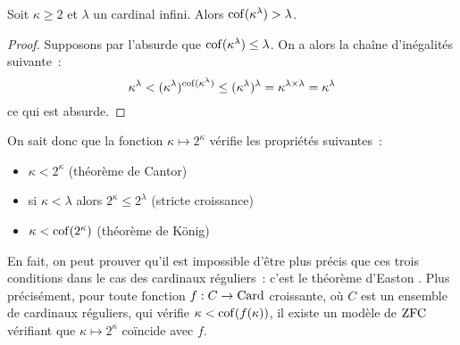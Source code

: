 \begin{theorem}
  Soit $\kappa \geq 2$ et $\lambda$ un cardinal infini. Alors
  $\operatorname{cof}(\kappa^\lambda) > \lambda$.
\end{theorem}

\begin{proof}
  Supposons par l'absurde que $\operatorname{cof}(\kappa^\lambda) \leq \lambda$. On a alors la
  chaîne d'inégalités suivante~:
  \[\kappa^\lambda < (\kappa^\lambda)^{\operatorname{cof}(\kappa^\lambda)} \leq
  (\kappa^\lambda)^\lambda = \kappa^{\lambda \times \lambda} = \kappa^\lambda\]
  ce qui est absurde.
\end{proof}

On sait donc que la fonction $\kappa \mapsto 2^\kappa$ vérifie les propriétés
suivantes~:
\begin{itemize}
\item $\kappa < 2^\kappa$ (théorème de Cantor)
\item si $\kappa < \lambda$ alors $2^\kappa \leq 2^\lambda$ (stricte croissance)
\item $\kappa < \operatorname{cof}(2^\kappa)$ (théorème de König)
\end{itemize}

En fait, on peut prouver qu'il est impossible d'être plus précis que ces trois
conditions dans le cas des cardinaux réguliers~: c'est le théorème d'Easton
\cite{Easton}. Plus précisément, pour toute fonction $f : C \to \operatorname{Card}$ croissante,
où $C$ est un ensemble de cardinaux réguliers, qui vérifie
$\kappa < \operatorname{cof}(f(\kappa))$, il existe un modèle de $\operatorname{ZFC}$ vérifiant que
$\kappa \mapsto 2^\kappa$ coïncide avec $f$.